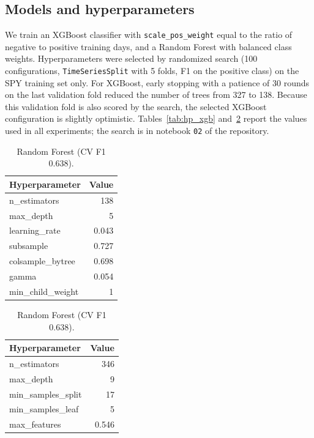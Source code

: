 \documentclass[11pt,a4paper]{article}
\begin{document}
\subsection{Models and hyperparameters}

We train an XGBoost classifier \citep{chen2016} with \texttt{scale\_pos\_weight} equal to the
ratio of negative to positive training days, and a Random Forest with balanced class weights.
Hyperparameters were selected by randomized search (100 configurations, \texttt{TimeSeriesSplit}
with 5 folds, F1 on the positive class) on the SPY training set only. For XGBoost, early stopping
with a patience of 30 rounds on the last validation fold reduced the number of trees from 327 to
138. Because this validation fold is also scored by the search, the selected XGBoost
configuration is slightly optimistic. Tables~\ref{tab:hp_xgb} and~\ref{tab:hp_rf} report the
values used in all experiments; the search is in notebook \texttt{02} of the repository.

\begin{table}[h]
\centering
\begin{minipage}{0.45\textwidth}
\centering
\begin{tabular}{lr}
\toprule
Hyperparameter & Value \\
\midrule
n\_estimators & 138 \\
max\_depth & 5 \\
learning\_rate & 0.043 \\
subsample & 0.727 \\
colsample\_bytree & 0.698 \\
gamma & 0.054 \\
min\_child\_weight & 1 \\
\bottomrule
\end{tabular}
\caption{XGBoost (CV F1 0.659).}
\label{tab:hp_xgb}
\end{minipage}
\hfill
\begin{minipage}{0.45\textwidth}
\centering
\begin{tabular}{lr}
\toprule
Hyperparameter & Value \\
\midrule
n\_estimators & 346 \\
max\_depth & 9 \\
min\_samples\_split & 17 \\
min\_samples\_leaf & 5 \\
max\_features & 0.546 \\
\bottomrule
\end{tabular}
\caption{Random Forest (CV F1 0.638).}
\label{tab:hp_rf}
\end{minipage}
\end{table}
\end{document}
